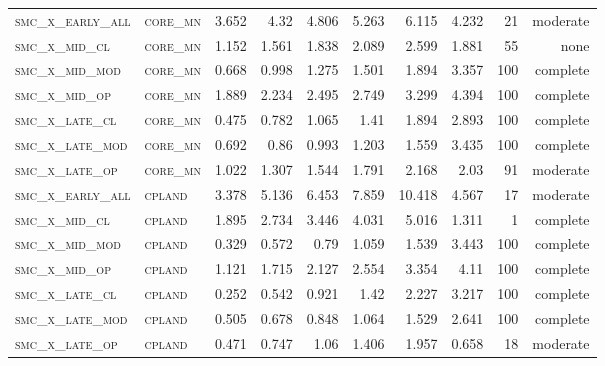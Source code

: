 \begin{landscape}
\begin{center}
\begin{footnotesize}
\begin{longtable}{llrrrrr|rrr}
\textsc{smc\_x\_early\_all} & \textsc{core\_mn  }   & 3.652      & 4.32       & 4.806      & 5.263      & 6.115      & 4.232      & 21    & moderate   \\
\textsc{smc\_x\_mid\_cl   } & \textsc{core\_mn  }   & 1.152      & 1.561      & 1.838      & 2.089      & 2.599      & 1.881      & 55    & none   \\
\textsc{smc\_x\_mid\_mod  } & \textsc{core\_mn  }   & 0.668      & 0.998      & 1.275      & 1.501      & 1.894      & 3.357      & 100   & complete   \\
\textsc{smc\_x\_mid\_op   } & \textsc{core\_mn  }   & 1.889      & 2.234      & 2.495      & 2.749      & 3.299      & 4.394      & 100   & complete   \\
\textsc{smc\_x\_late\_cl  } & \textsc{core\_mn  }   & 0.475      & 0.782      & 1.065      & 1.41       & 1.894      & 2.893      & 100   & complete   \\
\textsc{smc\_x\_late\_mod } & \textsc{core\_mn  }   & 0.692      & 0.86       & 0.993      & 1.203      & 1.559      & 3.435      & 100   & complete   \\
\textsc{smc\_x\_late\_op  } & \textsc{core\_mn  }   & 1.022      & 1.307      & 1.544      & 1.791      & 2.168      & 2.03       & 91    & moderate   \\
\textsc{smc\_x\_early\_all} & \textsc{cpland    }   & 3.378      & 5.136      & 6.453      & 7.859      & 10.418     & 4.567      & 17    & moderate   \\
\textsc{smc\_x\_mid\_cl   } & \textsc{cpland    }   & 1.895      & 2.734      & 3.446      & 4.031      & 5.016      & 1.311      & 1     & complete   \\
\textsc{smc\_x\_mid\_mod  } & \textsc{cpland    }   & 0.329      & 0.572      & 0.79       & 1.059      & 1.539      & 3.443      & 100   & complete   \\
\textsc{smc\_x\_mid\_op   } & \textsc{cpland    }   & 1.121      & 1.715      & 2.127      & 2.554      & 3.354      & 4.11       & 100   & complete   \\
\textsc{smc\_x\_late\_cl  } & \textsc{cpland    }   & 0.252      & 0.542      & 0.921      & 1.42       & 2.227      & 3.217      & 100   & complete   \\
\textsc{smc\_x\_late\_mod } & \textsc{cpland    }   & 0.505      & 0.678      & 0.848      & 1.064      & 1.529      & 2.641      & 100   & complete   \\
\textsc{smc\_x\_late\_op  } & \textsc{cpland    }   & 0.471      & 0.747      & 1.06       & 1.406      & 1.957      & 0.658      & 18    & moderate   \\

\end{longtable}
\end{footnotesize}
\end{center}
\end{landscape}
